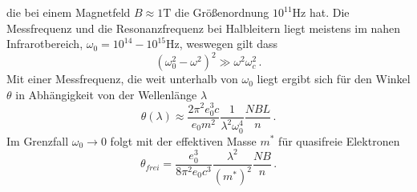 die bei einem Magnetfeld $B \approx 1 \si{\tesla}$ die Größenordnung $10^{11} \si{\hertz}$ hat. Die Messfrequenz und die
Resonanzfrequenz bei Halbleitern liegt meistens im nahen Infrarotbereich, $\omega_0 = 10^{14} - 10^{15} \si{\hertz}$, 
weswegen gilt dass
\begin{equation*}
    \left(\omega_0^2 - \omega^2\right) ^2 \gg \omega^2 \omega_c^2 \, .
\end{equation*} 
Mit einer Messfrequenz, die weit unterhalb von $\omega_0$ liegt ergibt sich für den Winkel $\theta$ in Abhängigkeit von
der Wellenlänge $\lambda$
\begin{equation}
    \label{eq:Winkel2}
    \theta \left(\lambda\right) \approx \frac{2 \pi^2 e_0^3 c}{e_0 m^2} \frac{1}{\lambda^2 \omega_0^4} \frac{N B L}{n} \, .
\end{equation}
Im Grenzfall $\omega_0 \rightarrow 0$ folgt mit der effektiven Masse $m^{*}$ für quasifreie Elektronen
\begin{equation}
    \label{eq:Winkel}
    \theta_\textit{frei} = \frac{e_0^3}{8 \pi^2 e_0 c^3} \frac{\lambda^2}{\left(m^{*}\right)^2} \frac{N B}{n} \, .
\end{equation}

